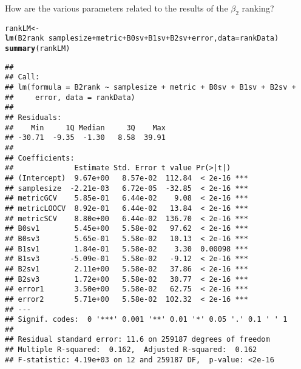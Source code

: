 \documentclass{article}\usepackage[]{graphicx}\usepackage[]{color}
\makeatletter
\newcommand{\hlopt}[1]{\textcolor[rgb]{0,0,0}{#1}}%
\newcommand{\hlstd}[1]{\textcolor[rgb]{0.345,0.345,0.345}{#1}}%
\newcommand{\hlkwb}[1]{\textcolor[rgb]{0.69,0.353,0.396}{#1}}%
\newcommand{\hlkwc}[1]{\textcolor[rgb]{0.333,0.667,0.333}{#1}}%
\newcommand{\hlkwd}[1]{\textcolor[rgb]{0.737,0.353,0.396}{\textbf{#1}}}%
\newenvironment{kframe}{%
 \def\at@end@of@kframe{}%
 \ifinner\ifhmode%
  \def\at@end@of@kframe{\end{minipage}}%
  \begin{minipage}{\columnwidth}%
 \fi\fi%
 \def\FrameCommand##1{\hskip\@totalleftmargin \hskip-\fboxsep
 \colorbox{shadecolor}{##1}\hskip-\fboxsep
     \hskip-\linewidth \hskip-\@totalleftmargin \hskip\columnwidth}%
 \MakeFramed {\advance\hsize-\width
   \@totalleftmargin\z@ \linewidth\hsize
   \@setminipage}}%
 {\par\unskip\endMakeFramed%
 \at@end@of@kframe}
\newenvironment{knitrout}{}{} %
\makeatother
\begin{document}
How are the various parameters related to the results of the $\beta _2$ ranking?
\begin{knitrout}
\color{fgcolor}\begin{kframe}
\begin{alltt}
\hlstd{rankLM} \hlkwb{<-} \hlkwd{lm}\hlstd{(B2rank} \hlopt{~} \hlstd{samplesize} \hlopt{+} \hlstd{metric} \hlopt{+} \hlstd{B0sv} \hlopt{+} \hlstd{B1sv} \hlopt{+} \hlstd{B2sv} \hlopt{+} \hlstd{error,} \hlkwc{data} \hlstd{= rankData)}
\hlkwd{summary}\hlstd{(rankLM)}
\end{alltt}
\begin{verbatim}
## 
## Call:
## lm(formula = B2rank ~ samplesize + metric + B0sv + B1sv + B2sv + 
##     error, data = rankData)
## 
## Residuals:
##    Min     1Q Median     3Q    Max 
## -30.71  -9.35  -1.30   8.58  39.91 
## 
## Coefficients:
##              Estimate Std. Error t value Pr(>|t|)    
## (Intercept)  9.67e+00   8.57e-02  112.84  < 2e-16 ***
## samplesize  -2.21e-03   6.72e-05  -32.85  < 2e-16 ***
## metricGCV    5.85e-01   6.44e-02    9.08  < 2e-16 ***
## metricLOOCV  8.92e-01   6.44e-02   13.84  < 2e-16 ***
## metricSCV    8.80e+00   6.44e-02  136.70  < 2e-16 ***
## B0sv1        5.45e+00   5.58e-02   97.62  < 2e-16 ***
## B0sv3        5.65e-01   5.58e-02   10.13  < 2e-16 ***
## B1sv1        1.84e-01   5.58e-02    3.30  0.00098 ***
## B1sv3       -5.09e-01   5.58e-02   -9.12  < 2e-16 ***
## B2sv1        2.11e+00   5.58e-02   37.86  < 2e-16 ***
## B2sv3        1.72e+00   5.58e-02   30.77  < 2e-16 ***
## error1       3.50e+00   5.58e-02   62.75  < 2e-16 ***
## error2       5.71e+00   5.58e-02  102.32  < 2e-16 ***
## ---
## Signif. codes:  0 '***' 0.001 '**' 0.01 '*' 0.05 '.' 0.1 ' ' 1
## 
## Residual standard error: 11.6 on 259187 degrees of freedom
## Multiple R-squared:  0.162,	Adjusted R-squared:  0.162 
## F-statistic: 4.19e+03 on 12 and 259187 DF,  p-value: <2e-16
\end{verbatim}
\end{kframe}
\end{knitrout}
\end{document}
